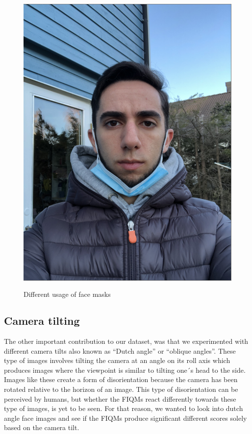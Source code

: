 \begin{figure}[h]
        {\includegraphics[scale = 0.18]{figures/1152.png}\hspace{1cm}}
    \caption{Different usage of face masks}
    \label{fig:masks}
\end{figure}


\subsection*{Camera tilting}
The other important contribution to our dataset, was that we experimented with different camera tilts also known as ``Dutch angle'' or ``oblique angles''. These type of images involves tilting the camera at an angle on its roll axis which produces images where the viewpoint is similar to tilting one´s head to the side. Images like these create a form of disorientation because the camera has been rotated relative to the horizon of an image. This type of disorientation can be perceived by humans, but whether the FIQMs react differently towards these type of images, is yet to be seen. For that reason, we wanted to look into dutch angle face images and see if the FIQMs produce significant different scores solely based on the camera tilt. 

